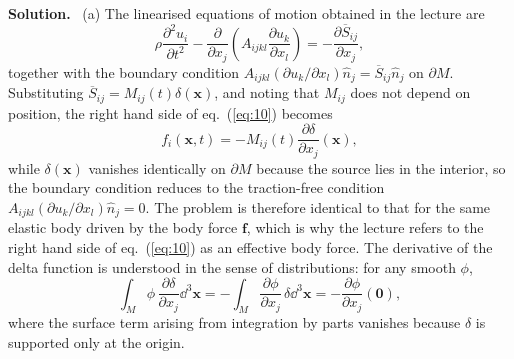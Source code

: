\documentclass[a4paper,12pt]{paper}
\newenvironment{solution}{\par\noindent\textbf{Solution.}\ }{\par\medskip}
\begin{document}
\begin{solution}
(a) The linearised equations of motion obtained in the lecture are
\begin{equation}
\rho\frac{\partial^{2}u_{i}}{\partial t^{2}}
-\frac{\partial}{\partial x_{j}}\left(A_{ijkl}\frac{\partial u_{k}}{\partial x_{l}}\right)
=-\frac{\partial\overline{S}_{ij}}{\partial x_{j}},
\label{eq:10}
\end{equation}
together with the boundary condition
$A_{ijkl}(\partial u_{k}/\partial x_{l})\hat{n}_{j}=\overline{S}_{ij}\hat{n}_{j}$ on
$\partial M$. Substituting $\overline{S}_{ij}=M_{ij}(t)\delta(\mathbf{x})$, and noting that
$M_{ij}$ does not depend on position, the right hand side of eq.~(\ref{eq:10}) becomes
\begin{equation}
f_{i}(\mathbf{x},t)=-M_{ij}(t)\frac{\partial\delta}{\partial x_{j}}(\mathbf{x}),
\label{eq:11}
\end{equation}
while $\delta(\mathbf{x})$ vanishes identically on $\partial M$ because the source lies in
the interior, so the boundary condition reduces to the traction-free condition
$A_{ijkl}(\partial u_{k}/\partial x_{l})\hat{n}_{j}=0$. The problem is therefore identical
to that for the same elastic body driven by the body force $\mathbf{f}$, which is why the
lecture refers to the right hand side of eq.~(\ref{eq:10}) as an effective body force.
The derivative of the delta function is understood in the sense of distributions: for any
smooth $\phi$,
\begin{equation}
\int_{M}\phi\,\frac{\partial\delta}{\partial x_{j}}\dd^{3}\mathbf{x}
=-\int_{M}\frac{\partial\phi}{\partial x_{j}}\,\delta\dd^{3}\mathbf{x}
=-\frac{\partial\phi}{\partial x_{j}}(\mathbf{0}),
\label{eq:12}
\end{equation}
where the surface term arising from integration by parts vanishes because $\delta$ is
supported only at the origin.


\end{solution}
\end{document}
